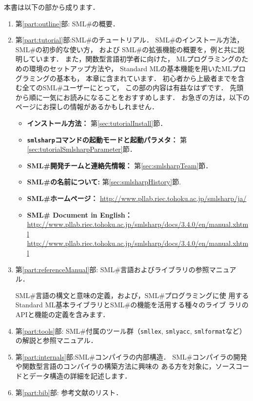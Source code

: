 \documentclass{jbook}
\newcommand{\smlsharp}{SML\#}
\newcommand{\version}{3.4.0}
\newcommand{\documentUrlEn}{\url{http://www.pllab.riec.tohoku.ac.jp/smlsharp/docs/3.4.0/en/manual.xhtml}}
\begin{document}
\ifjp%
	本書は以下の部から成ります．
\begin{enumerate}
\item
	第\ref{part:outline}部: \smlsharp{}の概要．
\item
	第\ref{part:tutorial}部:\smlsharp{}のチュートリアル．
	\smlsharp{}のインストール方法，
\smlsharp{}の初歩的な使い方，
および
\smlsharp{}の拡張機能の概要を，例と共に説明しています．
	また，関数型言語初学者に向けた，
MLプログラミングのための環境のセットアップ方法や，
Standard MLの基本機能を用いたMLプログラミングの基本も，
本章に含まれています．
	初心者から上級者までを含む全ての\smlsharp{}ユーザーにとって，
この部の内容は有益なはずです．
	先頭から順に一気にお読みになることをおすすめします．
	お急ぎの方は，以下のページにお探しの情報があるかもしれません．
\begin{itemize}
\item {\bf インストール方法：}
第\ref{sec:tutorialInstall}節．
\item {\bf {\tt smlsharp}コマンドの起動モードと起動パラメタ：}
第\ref{sec:tutorialSmlsharpParameter}節．
\item {\bf \smlsharp{}開発チームと連絡先情報：} 
第\ref{sec:smlsharpTeam}節．
\item {\bf \smlsharp{}の名前について:}
第\ref{sec:smlsharpHistory}節.
\item {\bf \smlsharp{}ホームページ：}
\url{http://www.pllab.riec.tohoku.ac.jp/smlsharp/ja/}
\item {\bf \smlsharp{} Document in English：}
\url{http://www.pllab.riec.tohoku.ac.jp/smlsharp/docs/\version/en/manual.xhtml}
\documentUrlEn
\end{itemize}   

\item
	第\ref{part:referenceManual}部:
\smlsharp{}言語およびライブラリの参照マニュアル．

\smlsharp{}言語の構文と意味の定義，および，\smlsharp{}プログラミングに使
用するStandard ML基本ライブラリと\smlsharp{}の機能を活用する種々のライブ
ラリのAPIと機能の定義を含みます．

\item
	第\ref{part:tools}部:
\smlsharp{}付属のツール群（{\tt smllex}, {\tt smlyacc}, {\tt smlformat}など）
の解説と参照マニュアル．

\item
	第\ref{part:internals}部:\smlsharp{}コンパイラの内部構造．
\smlsharp{}コンパイラの開発や関数型言語のコンパイラの構築方法に興味の
ある方を対象に，ソースコードとデータ構造の詳細を記述します．

\item
	第\ref{part:bib}部: 参考文献のリスト．
\end{enumerate}
\end{document}
